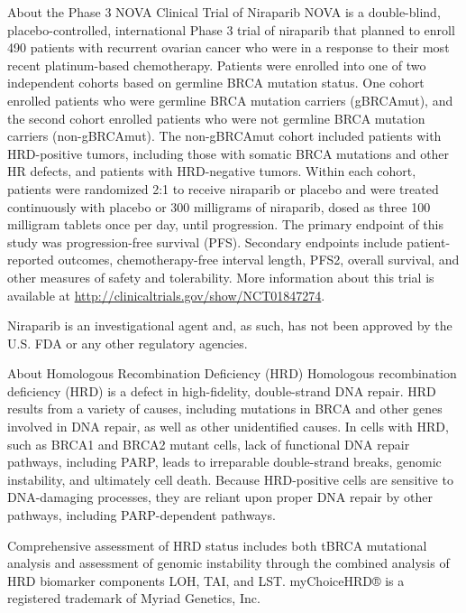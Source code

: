 \documentclass[letterpaper,12pt,english]{sphinxmanual}
\begin{document}
About the Phase 3 NOVA Clinical Trial of Niraparib
NOVA is a double-blind, placebo-controlled, international Phase 3 trial of niraparib that planned to enroll 490 patients with recurrent ovarian cancer who were in a response to their most recent platinum-based chemotherapy. Patients were enrolled into one of two independent cohorts based on germline BRCA mutation status. One cohort enrolled patients who were germline BRCA mutation carriers (gBRCAmut), and the second cohort enrolled patients who were not germline BRCA mutation carriers (non-gBRCAmut). The non-gBRCAmut cohort included patients with HRD-positive tumors, including those with somatic BRCA mutations and other HR defects, and patients with HRD-negative tumors. Within each cohort, patients were randomized 2:1 to receive niraparib or placebo and were treated continuously with placebo or 300 milligrams of niraparib, dosed as three 100 milligram tablets once per day, until progression. The primary endpoint of this study was progression-free survival (PFS). Secondary endpoints include patient-reported outcomes, chemotherapy-free interval length, PFS2, overall survival, and other measures of safety and tolerability.  More information about this trial is available at \url{http://clinicaltrials.gov/show/NCT01847274}.

Niraparib is an investigational agent and, as such, has not been approved by the U.S. FDA or any other regulatory agencies.

About Homologous Recombination Deficiency (HRD)
Homologous recombination deficiency (HRD) is a defect in high-fidelity, double-strand DNA repair. HRD results from a variety of causes, including mutations in BRCA and other genes involved in DNA repair, as well as other unidentified causes.  In cells with HRD, such as BRCA1 and BRCA2 mutant cells, lack of functional DNA repair pathways, including PARP, leads to irreparable double-strand breaks, genomic instability, and ultimately cell death. Because HRD-positive cells are sensitive to DNA-damaging processes, they are reliant upon proper DNA repair by other pathways, including PARP-dependent pathways.

Comprehensive assessment of HRD status includes both tBRCA mutational analysis and assessment of genomic instability through the combined analysis of HRD biomarker components LOH, TAI, and LST. myChoiceHRD® is a registered trademark of Myriad Genetics, Inc.
\end{document}
